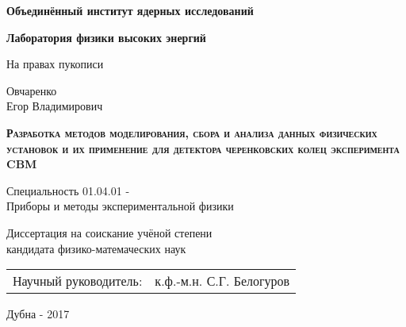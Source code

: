 \begin{titlepage}

\centering

\textbf{
Объединённый институт ядерных исследований
}


\textbf{
Лаборатория физики высоких энергий
}

\vspace{2cm}

\begin{flushright}
На правах пукописи
\end{flushright}

\vspace{1cm}

Овчаренко \\
Егор Владимирович

\vspace{2cm}

\textbf{
\textsc{
Разработка методов моделирования, сбора и анализа данных
физических установок и их применение для детектора черенковских
колец эксперимента CBM
}
}

\vspace{3cm}

Специальность 01.04.01 - \\
Приборы и методы экспериментальной физики

\vspace{2cm}

Диссертация на соискание учёной степени \\
кандидата физико-матемаческих наук

\vspace{2cm}

\begin{tabu} to \textwidth { X[l] X[r] }
	{Научный руководитель:} & {к.ф.-м.н. С.Г. Белогуров} \\
\end{tabu}

\vspace{6cm}

Дубна - 2017

\end{titlepage}
